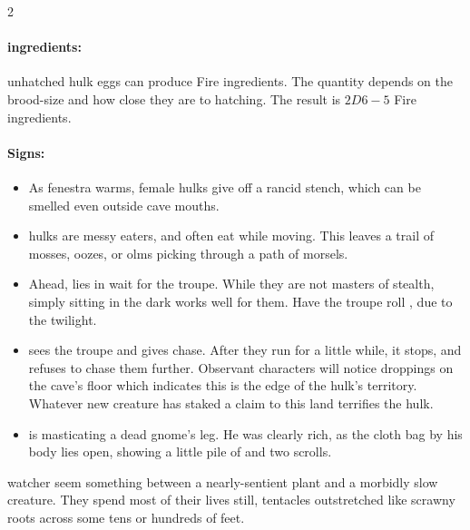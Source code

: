 \begin{multicols}{2}
\paragraph{\Glspl{ingredient}:}
unhatched \gls{hulk} eggs can produce Fire \glspl{ingredient}.
The quantity depends on the brood-size and how close they are to hatching.
The result is $2D6-5$ Fire \glspl{ingredient}.

\umberhulk

\umberhulk

\paragraph{Signs:}
\begin{itemize}
  \item
  As \gls{fenestra} warms, female \glspl{hulk} give off a rancid stench, which can be smelled even outside cave mouths.
  \item
  \Glspl{hulk} are messy eaters, and often eat while moving.
  This leaves a trail of mosses, oozes, or \glspl{olm} picking through a path of morsels.
\end{itemize}

\showEnc

\begin{itemize}
  \item
  Ahead,  lies in wait for the troupe.
  While they are not masters of stealth, simply sitting in the dark works well for them.
  Have the troupe roll , \tn[9] due to the twilight.
  \item
   sees the troupe and gives chase.
  After they run for a little while, it stops, and refuses to chase them further.
  Observant characters will notice droppings on the cave's floor which indicates this is the edge of the \gls{hulk}'s territory.
  Whatever new creature has staked a claim to this land terrifies the \gls{hulk}.
  \item
   is masticating a dead gnome's leg.
  He was clearly rich, as the cloth bag by his body lies open, showing a little pile of  and two scrolls.
\end{itemize}

  {watcher}%
seem something between a nearly-sentient plant and a morbidly slow creature.
They spend most of their lives still, tentacles outstretched like scrawny roots across some tens or hundreds of feet.


\end{multicols}
